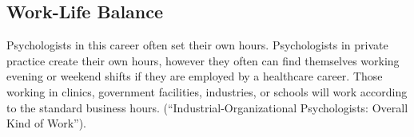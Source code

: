 \begin{multicols}{2}
\section{Work-Life Balance}
Psychologists in this career often set their own hours. Psychologists in private practice create their own hours, however they often can find themselves working evening or weekend shifts if they are employed by a healthcare career. Those working in clinics, government facilities, industries, or schools will work according to the standard business hours. (“Industrial-Organizational Psychologists: Overall Kind of Work”). 
\end{multicols}